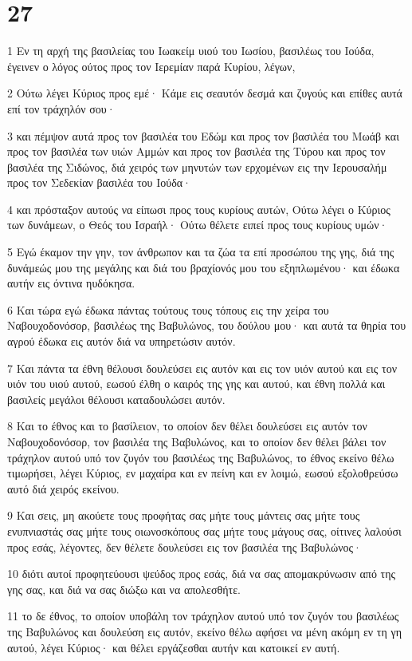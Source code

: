 \chapter{27}

\par 1 Εν τη αρχή της βασιλείας του Ιωακείμ υιού του Ιωσίου, βασιλέως του Ιούδα, έγεινεν ο λόγος ούτος προς τον Ιερεμίαν παρά Κυρίου, λέγων,
\par 2 Ούτω λέγει Κύριος προς εμέ· Κάμε εις σεαυτόν δεσμά και ζυγούς και επίθες αυτά επί τον τράχηλόν σου·
\par 3 και πέμψον αυτά προς τον βασιλέα του Εδώμ και προς τον βασιλέα του Μωάβ και προς τον βασιλέα των υιών Αμμών και προς τον βασιλέα της Τύρου και προς τον βασιλέα της Σιδώνος, διά χειρός των μηνυτών των ερχομένων εις την Ιερουσαλήμ προς τον Σεδεκίαν βασιλέα του Ιούδα·
\par 4 και πρόσταξον αυτούς να είπωσι προς τους κυρίους αυτών, Ούτω λέγει ο Κύριος των δυνάμεων, ο Θεός του Ισραήλ· Ούτω θέλετε ειπεί προς τους κυρίους υμών·
\par 5 Εγώ έκαμον την γην, τον άνθρωπον και τα ζώα τα επί προσώπου της γης, διά της δυνάμεώς μου της μεγάλης και διά του βραχίονός μου του εξηπλωμένου· και έδωκα αυτήν εις όντινα ηυδόκησα.
\par 6 Και τώρα εγώ έδωκα πάντας τούτους τους τόπους εις την χείρα του Ναβουχοδονόσορ, βασιλέως της Βαβυλώνος, του δούλου μου· και αυτά τα θηρία του αγρού έδωκα εις αυτόν διά να υπηρετώσιν αυτόν.
\par 7 Και πάντα τα έθνη θέλουσι δουλεύσει εις αυτόν και εις τον υιόν αυτού και εις τον υιόν του υιού αυτού, εωσού έλθη ο καιρός της γης και αυτού, και έθνη πολλά και βασιλείς μεγάλοι θέλουσι καταδουλώσει αυτόν.
\par 8 Και το έθνος και το βασίλειον, το οποίον δεν θέλει δουλεύσει εις αυτόν τον Ναβουχοδονόσορ, τον βασιλέα της Βαβυλώνος, και το οποίον δεν θέλει βάλει τον τράχηλον αυτού υπό τον ζυγόν του βασιλέως της Βαβυλώνος, το έθνος εκείνο θέλω τιμωρήσει, λέγει Κύριος, εν μαχαίρα και εν πείνη και εν λοιμώ, εωσού εξολοθρεύσω αυτό διά χειρός εκείνου.
\par 9 Και σεις, μη ακούετε τους προφήτας σας μήτε τους μάντεις σας μήτε τους ενυπνιαστάς σας μήτε τους οιωνοσκόπους σας μήτε τους μάγους σας, οίτινες λαλούσι προς εσάς, λέγοντες, δεν θέλετε δουλεύσει εις τον βασιλέα της Βαβυλώνος·
\par 10 διότι αυτοί προφητεύουσι ψεύδος προς εσάς, διά να σας απομακρύνωσιν από της γης σας, και διά να σας διώξω και να απολεσθήτε.
\par 11 το δε έθνος, το οποίον υποβάλη τον τράχηλον αυτού υπό τον ζυγόν του βασιλέως της Βαβυλώνος και δουλεύση εις αυτόν, εκείνο θέλω αφήσει να μένη ακόμη εν τη γη αυτού, λέγει Κύριος· και θέλει εργάζεσθαι αυτήν και κατοικεί εν αυτή.
